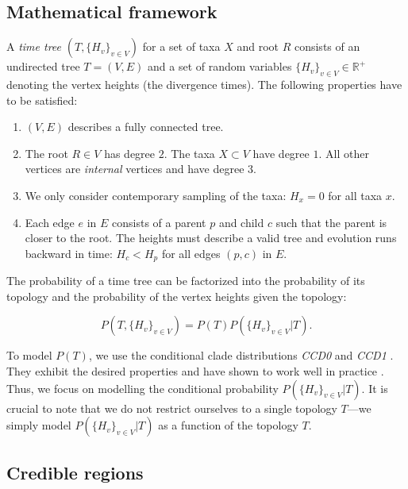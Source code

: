 \documentclass[10pt,letterpaper]{article}
\newcommand{\Pro}[1]{P\left(#1\right)}
\begin{document}
\subsection*{Mathematical framework}

A \emph{time tree} $(T, \{H_v\}_{v \in V})$ for a set of taxa $X$ and root $R$ consists of an undirected tree $T = (V, E)$ and a set of random variables $\{H_v\}_{v \in V} \in \mathbb{R}^+$ denoting the vertex heights (the divergence times). The following properties have to be satisfied:

\begin{enumerate}
	\item $(V, E)$ describes a fully connected tree.
	\item The root $R \in V$ has degree $2$. The taxa $X \subset V$ have degree $1$. All other vertices are \emph{internal} vertices and have degree $3$.
	\item We only consider contemporary sampling of the taxa: $H_x = 0$ for all taxa $x$.
	\item Each edge $e$ in $E$ consists of a parent $p$ and child $c$ such that the parent is closer to the root. The heights must describe a valid tree and evolution runs backward in time: $H_c < H_p$ for all edges $(p, c)$ in $E$.
\end{enumerate}

The probability of a time tree can be factorized into the probability of its topology and the probability of the vertex heights given the topology:

$$
\Pro{T, \{H_v\}_{v \in V}} = \Pro{T} \Pro{\{H_v\}_{v \in V} | T}.
$$

To model $\Pro{T}$, we use the conditional clade distributions \emph{CCD0} and \emph{CCD1} \cite{ccd,ccdlarget}. They exhibit the desired properties and have shown to work well in practice \cite{ccd,ccd0expansion,hipstr}. Thus, we focus on modelling the conditional probability $\Pro{\{H_v\}_{v \in V} | T}$. It is crucial to note that we do not restrict ourselves to a single topology $T$---we simply model $\Pro{\{H_v\}_{v \in V} | T}$ as a function of the topology $T$.

\subsection*{Credible regions}
\end{document}
